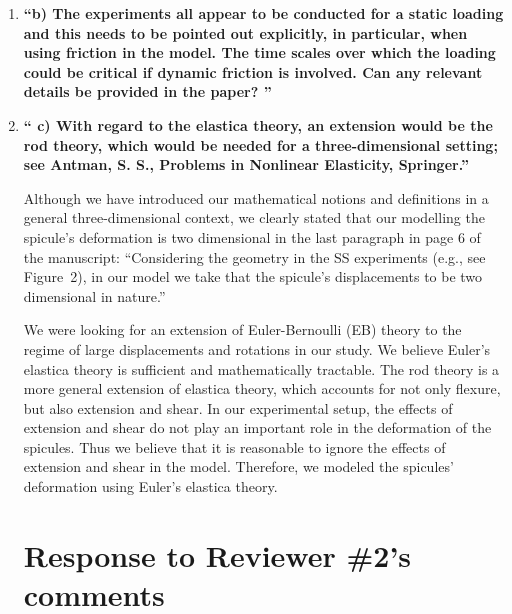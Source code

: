 \documentclass[11pt,letterpaper]{report}
\newcommand{\physe}{\hat{\mathbscr{e}}} %
\begin{document}
\begin{enumerate}[label=\textit{1.\arabic*},wide, labelwidth=!, labelindent=0pt]
\item \label{r1c3} {\bf ``b) The experiments all appear to be conducted for a static loading and this needs to be pointed out explicitly, in particular, when using friction in the model. The time scales over which the loading could be critical if dynamic friction is involved. Can any relevant details be provided in the paper?
''}



\item \label{r1c4} {\bf ``
c) With regard to the elastica theory, an extension would be the rod theory, which would be needed for a three-dimensional setting; see Antman, S. S., Problems in Nonlinear Elasticity, Springer.''}

Although we have introduced our mathematical notions and definitions in a general three-dimensional context, we clearly stated that our modelling the spicule's deformation is two dimensional in the last paragraph in page 6 of the manuscript:
``Considering the geometry in the SS experiments (e.g., see Figure~2), in our model we take that the spicule's displacements to be two dimensional in nature.''

We were looking for an extension of Euler-Bernoulli (EB) theory to the regime of large displacements and rotations in our study. We believe Euler's elastica theory is sufficient and mathematically tractable.
The rod theory is a more general extension of elastica theory, which accounts for not only flexure, but also extension and shear.
In our experimental setup, the effects of extension and shear do not play an important role in the deformation of the spicules. Thus we believe that it is reasonable to ignore the effects of extension and shear in the model. Therefore, we modeled the spicules' deformation using Euler's elastica theory.




\clearpage

\section*{Response to Reviewer \#2's comments}
\label{rev2}


\end{enumerate}
\end{document}
